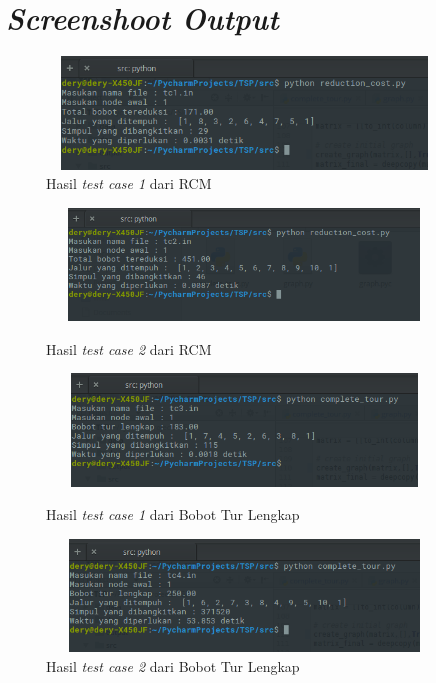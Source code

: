 \documentclass{article}
\begin{document}
	\section{\textit{Screenshoot Output}}
	
	\begin{figure}[htbp]
 	\centering
  	\includegraphics[width=10.5cm, height=3cm]{rcm_1.png}
  	\caption{Hasil \textit{test case 1} dari RCM}
	\end{figure}
	\begin{figure}[htbp]
	\centering
  	\includegraphics[width=10.5cm, height=3cm]{rcm_2.png}
  	\caption{Hasil \textit{test case 2} dari RCM}
  	\vspace{5mm}
  	\includegraphics[width=10.5cm, height=3cm]{com_1.png}
  	\caption{Hasil \textit{test case 1} dari Bobot Tur Lengkap}
  	\vspace{5mm}
  	\includegraphics[width=10.5cm, height=3cm]{com_2.png}
  	\caption{Hasil \textit{test case 2} dari Bobot Tur Lengkap}
	\end{figure}
	
\end{document}
